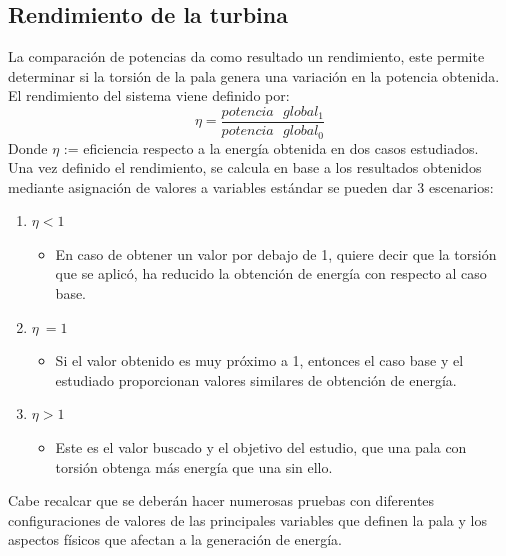  \subsection{Rendimiento de la turbina}
 \label{section:rendimiento}
 
La comparación de potencias da como resultado un rendimiento, este permite determinar si la torsión de la pala genera una variación en la potencia obtenida.\\

El rendimiento del sistema viene definido por:
\begin{equation}
  \eta = \dfrac{potencia \text{ } global_1}{potencia \text{ } global_0}  
 \label{def:rendimiento_potencias}
 \end{equation}
  Donde $\eta$ := eficiencia respecto a la energía obtenida en dos casos estudiados.\\
 
 Una vez definido el rendimiento, se calcula en base a los resultados obtenidos mediante asignación de valores a variables estándar se pueden dar 3 escenarios:
 

\begin{enumerate}
    \item $\eta < 1$
        \begin{itemize}
            \item En caso de obtener un valor por debajo de 1, quiere decir que la torsión que se aplicó, ha reducido la obtención de energía con respecto al caso base. 
        \end{itemize}
    \item $\eta ~= 1$
        \begin{itemize}
            \item Si el valor obtenido es muy próximo a 1, entonces el caso base y el estudiado proporcionan valores similares de obtención de energía.
        \end{itemize}
    \item $\eta > 1$
        \begin{itemize}
            \item Este es el valor buscado y el objetivo del estudio, que una pala con torsión obtenga más energía que una sin ello.
        \end{itemize}
\end{enumerate}

Cabe recalcar que se deberán hacer numerosas pruebas con diferentes configuraciones de valores de las principales variables que definen la pala y los aspectos físicos que afectan a la generación de energía.